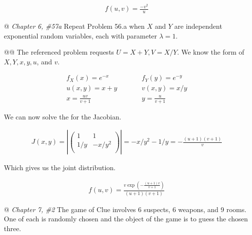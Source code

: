 \documentclass[11pt]{article}\usepackage[]{graphicx}\usepackage[]{xcolor}
\begin{document}
\begin{easylist}[enumerate]
    \begin{equation}
        \begin{aligned}
            f(u, v) = \frac{-v^2}{u}
        \end{aligned}
    \end{equation}

    @ \textit{Chapter 6, \#57a} Repeat Problem 56.a when $X$ and $Y$ are independent exponential random variables, each
    with parameter $\lambda = 1$.

    @@ The referenced problem requests $U = X + Y, V = X/Y$. We know the form of $X, Y, x, y, u$, and $v$.

    \begin{equation}
        \begin{aligned}
            f_X(x) = e^{-x} &\qquad& f_Y(y) = e^{-y}\\
            u(x,y) = x + y &\qquad& v(x, y) = x/y\\
            x = \frac{uv}{v+1} &\qquad& y = \frac{u}{v+1}
        \end{aligned}
    \end{equation}

    We can now solve the for the Jacobian.

    \begin{equation}
        \begin{aligned}
            J(x, y) = \left| \begin{pmatrix}
                                 1 & 1\\
                                 1/y & -x/y^2\\
                             \end{pmatrix}
                      \right| = -x/y^2 - 1/y = -\frac{(u+1) (v+1)}{v}
        \end{aligned}
    \end{equation}

    Which gives us the joint distribution.

    \begin{equation}
        \begin{aligned}
            f(u, v) = \frac{v \exp\left({-\frac{(u+1) v}{v+1} }\right)}{(u+1) (v+1)}
        \end{aligned}
    \end{equation}

    @ \textit{Chapter 7, \#2} The game of Clue involves 6 suspects, 6 weapons, and 9 rooms. One of each is randomly
    chosen and the object of the game is to guess the chosen three.


\end{easylist}
\end{document}
